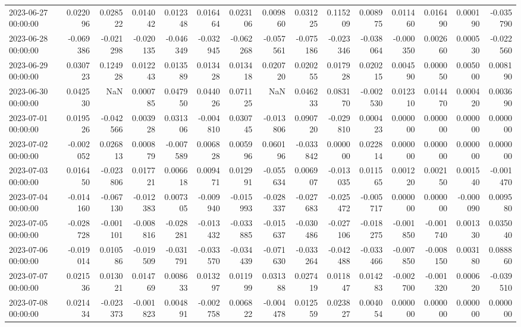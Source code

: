 \begin{tabular}{lrrrrrrrrrrrrrr}
2023-06-27 00:00:00 & 0.022096 & 0.028522 & 0.014042 & 0.012348 & 0.016464 & 0.023106 & 0.009860 & 0.031225 & 0.115209 & 0.008975 & 0.011460 & 0.016490 & 0.000190 & -0.035790 \\
2023-06-28 00:00:00 & -0.069386 & -0.021298 & -0.020135 & -0.046349 & -0.032945 & -0.062268 & -0.057561 & -0.075186 & -0.023346 & -0.038064 & -0.000350 & 0.002660 & 0.000530 & -0.022560 \\
2023-06-29 00:00:00 & 0.030723 & 0.124928 & 0.012243 & 0.013589 & 0.013428 & 0.013418 & 0.020720 & 0.020255 & 0.017928 & 0.020215 & 0.004590 & 0.000050 & 0.005000 & 0.008190 \\
2023-06-30 00:00:00 & 0.042530 & NaN & 0.000785 & 0.047950 & 0.044026 & 0.071125 & NaN & 0.046233 & 0.083170 & -0.002530 & 0.012310 & 0.014470 & 0.000420 & 0.003690 \\
2023-07-01 00:00:00 & 0.019526 & -0.042566 & 0.003928 & 0.031306 & -0.004810 & 0.030745 & -0.013806 & 0.090720 & -0.029810 & 0.000423 & 0.000000 & 0.000000 & 0.000000 & 0.000000 \\
2023-07-02 00:00:00 & -0.002052 & 0.026813 & 0.000879 & -0.007589 & 0.006828 & 0.005996 & 0.060196 & -0.033842 & 0.000000 & 0.022814 & 0.000000 & 0.000000 & 0.000000 & 0.000000 \\
2023-07-03 00:00:00 & 0.016450 & -0.023806 & 0.017721 & 0.006618 & 0.009471 & 0.012991 & -0.055634 & 0.006907 & -0.013035 & 0.011565 & 0.001220 & 0.002150 & 0.001540 & -0.001470 \\
2023-07-04 00:00:00 & -0.014160 & -0.067130 & -0.012383 & 0.007305 & -0.009940 & -0.015993 & -0.028337 & -0.027683 & -0.025472 & -0.005717 & 0.000000 & 0.000000 & -0.000090 & 0.009580 \\
2023-07-05 00:00:00 & -0.028728 & -0.001101 & -0.008816 & -0.028281 & -0.013432 & -0.033885 & -0.015637 & -0.030486 & -0.027106 & -0.018275 & -0.001850 & -0.001740 & 0.001330 & 0.035040 \\
2023-07-06 00:00:00 & -0.019014 & 0.010586 & -0.019509 & -0.031791 & -0.033570 & -0.034439 & -0.071630 & -0.033264 & -0.042488 & -0.033466 & -0.007850 & -0.008150 & 0.003180 & 0.088860 \\
2023-07-07 00:00:00 & 0.021536 & 0.013021 & 0.014769 & 0.008633 & 0.013297 & 0.011999 & 0.031388 & 0.027419 & 0.011847 & 0.014283 & -0.002700 & -0.001320 & 0.000620 & -0.039510 \\
2023-07-08 00:00:00 & 0.021434 & -0.023373 & -0.001823 & 0.004891 & -0.002758 & 0.006822 & -0.004478 & 0.012559 & 0.023827 & 0.004054 & 0.000000 & 0.000000 & 0.000000 & 0.000000 \\

\end{tabular}
